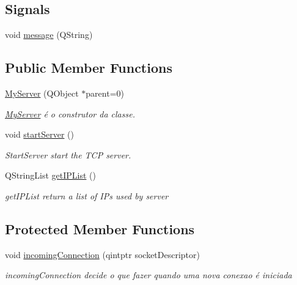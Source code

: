 \subsection*{Signals}
\begin{DoxyCompactItemize}
\item 
void \hyperlink{class_my_server_a2b884bce37840b1b461363a37b463b30}{message} (Q\+String)
\end{DoxyCompactItemize}
\subsection*{Public Member Functions}
\begin{DoxyCompactItemize}
\item 
\hyperlink{class_my_server_ac9e5ca7b551a5df90d5b39260f7e5404}{My\+Server} (Q\+Object $\ast$parent=0)
\begin{DoxyCompactList}\small\item\em \hyperlink{class_my_server}{My\+Server} é o construtor da classe. \end{DoxyCompactList}\item 
void \hyperlink{class_my_server_a962f0e205a0aaf08b12d50d1315a8c90}{start\+Server} ()
\begin{DoxyCompactList}\small\item\em Start\+Server start the T\+CP server. \end{DoxyCompactList}\item 
Q\+String\+List \hyperlink{class_my_server_ac10d498dcc2b5d691f131f17b6602a59}{get\+I\+P\+List} ()
\begin{DoxyCompactList}\small\item\em get\+I\+P\+List return a list of I\+Ps used by server \end{DoxyCompactList}\end{DoxyCompactItemize}
\subsection*{Protected Member Functions}
\begin{DoxyCompactItemize}
\item 
void \hyperlink{class_my_server_a635c7a1e6817285ffb1a2a3842df010b}{incoming\+Connection} (qintptr socket\+Descriptor)
\begin{DoxyCompactList}\small\item\em incoming\+Connection decide o que fazer quando uma nova conexao é iniciada \end{DoxyCompactList}\end{DoxyCompactItemize}


